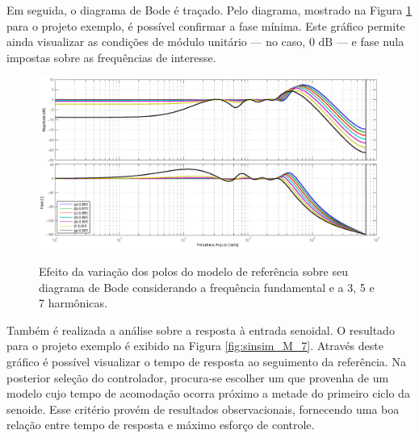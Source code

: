 \documentclass[repeatfields,oneside]{tcc}
\begin{document}
Em seguida, o diagrama de Bode é traçado.
Pelo diagrama, mostrado na Figura \ref{fig:bode_M_7} para o projeto exemplo, é possível confirmar a fase mínima.
Este gráfico permite ainda visualizar as condições de módulo unitário --- no caso, $0 \text{ dB}$ --- e fase nula impostas sobre as frequências de interesse.

\begin{figure}[h]
    \centering
    \caption{Efeito da variação dos polos do modelo de referência sobre seu diagrama de Bode considerando a frequência fundamental e a 3{\textordfeminine}, 5{\textordfeminine} e 7{\textordfeminine} harmônicas.}
    \includegraphics[trim={80 24.5 80 43}, clip, width=0.78\linewidth]{fig/bode_M_7.eps}
    \\
    \label{fig:bode_M_7}
\end{figure}

\newpage

Também é realizada a análise sobre a resposta à entrada senoidal.
O resultado para o projeto exemplo é exibido na Figura \ref{fig:sinsim_M_7}.
Através deste gráfico é possível visualizar o tempo de resposta ao seguimento da referência.
Na posterior seleção do controlador, procura-se escolher um que provenha de um modelo cujo tempo de acomodação ocorra próximo a metade do primeiro ciclo da senoide.
Esse critério provém de resultados observacionais, fornecendo uma boa relação entre tempo de resposta e máximo esforço de controle.
\end{document}
